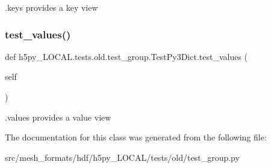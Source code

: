 \begin{DoxyVerb}.keys provides a key view \end{DoxyVerb}
 \mbox{\label{classh5py__LOCAL_1_1tests_1_1old_1_1test__group_1_1TestPy3Dict_a9f8eda8a96f8a67a73a678b6d9278789}} 
\subsubsection{\texorpdfstring{test\+\_\+values()}{test\_values()}}
{\footnotesize\ttfamily def h5py\+\_\+\+L\+O\+C\+A\+L.\+tests.\+old.\+test\+\_\+group.\+Test\+Py3\+Dict.\+test\+\_\+values (\begin{DoxyParamCaption}\item[{}]{self }\end{DoxyParamCaption})}

\begin{DoxyVerb}.values provides a value view \end{DoxyVerb}
 

The documentation for this class was generated from the following file\+:\begin{DoxyCompactItemize}
\item 
src/mesh\+\_\+formats/hdf/h5py\+\_\+\+L\+O\+C\+A\+L/tests/old/test\+\_\+group.\+py\end{DoxyCompactItemize}
